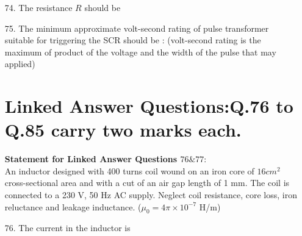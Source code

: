 \documentclass[journal,12pt,onecolumn]{IEEEtran}
\theoremstyle{remark}
\begin{document}
\begin{enumerate}
  \item [74.] The resistance $R$ should be
\begin{enumerate}
\end{enumerate}  
    \item [75.] The minimum approximate volt-second rating of pulse transformer suitable for triggering the SCR should be : (volt-second rating is the maximum of product of the voltage and the width of the pulse that may applied)
      \begin{enumerate}    
              \end{enumerate}   
\section{Linked Answer Questions:Q.76 to Q.85 carry two marks each.}              
 \textbf{Statement for Linked Answer Questions $76\&77:$} \\        
 An inductor designed with 400 turns coil wound on an iron core of $16 cm^2$ cross-sectional area and with a cut of an air gap length of 1 mm. The coil is connected to a 230 V, 50 Hz AC supply. Neglect coil resistance, core loss, iron reluctance and leakage inductance. ($\mu_0 = 4\pi \times 10^{-7}$ H/m)
    \item [76.] The current in the inductor is
    \begin{enumerate}
    \end{enumerate}
    

\end{enumerate}
\end{document}
